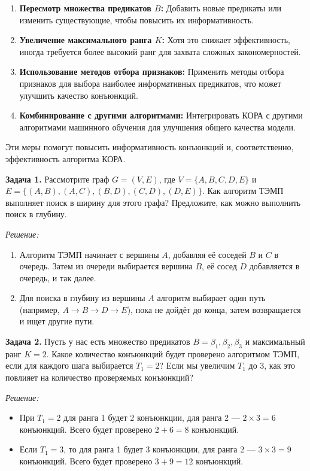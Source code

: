 \begin{itemize}
\begin{enumerate}
    \item \textbf{Пересмотр множества предикатов \( B \):} Добавить новые предикаты или изменить существующие, чтобы повысить их информативность.
    \item \textbf{Увеличение максимального ранга \( K \):} Хотя это снижает эффективность, иногда требуется более высокий ранг для захвата сложных закономерностей.
    \item \textbf{Использование методов отбора признаков:} Применить методы отбора признаков для выбора наиболее информативных предикатов, что может улучшить качество конъюнкций.
    \item \textbf{Комбинирование с другими алгоритмами:} Интегрировать КОРА с другими алгоритмами машинного обучения для улучшения общего качества модели.
\end{enumerate}

Эти меры помогут повысить информативность конъюнкций и, соответственно, эффективность алгоритма КОРА.

\textbf{Задача 1.}
\newline
Рассмотрите граф $G = (V, E)$, где $V = \{A, B, C, D, E\}$ и $E = \{(A, B), (A, C), (B, D), (C, D), (D, E)\}$. Как алгоритм ТЭМП выполняет поиск в ширину для этого графа? Предложите, как можно выполнить поиск в глубину.

\textit{Решение:}
\begin{enumerate}
    \item Алгоритм ТЭМП начинает с вершины $A$, добавляя её соседей $B$ и $C$ в очередь. Затем из очереди выбирается вершина $B$, её сосед $D$ добавляется в очередь, и так далее.
    \item Для поиска в глубину из вершины $A$ алгоритм выбирает один путь (например, $A \to B \to D \to E$), пока не дойдёт до конца, затем возвращается и ищет другие пути.
\end{enumerate}

\textbf{Задача 2.}
\newline
Пусть у нас есть множество предикатов $B = \beta_1, \beta_2, \beta_3$ и максимальный ранг $K = 2$. Какое количество конъюнкций будет проверено алгоритмом ТЭМП, если для каждого шага выбирается $T_1 = 2$? Если мы увеличим $T_1$ до 3, как это повлияет на количество проверяемых конъюнкций?

\textit{Решение:}
\begin{itemize}
    \item При $T_1 = 2$ для ранга 1 будет 2 конъюнкции, для ранга 2 --- $2 \times 3 = 6$ конъюнкций. Всего будет проверено $2 + 6 = 8$ конъюнкций.
    \item Если $T_1 = 3$, то для ранга 1 будет 3 конъюнкции, для ранга 2 --- $3 \times 3 = 9$ конъюнкций. Всего будет проверено $3 + 9 = 12$ конъюнкций.
\end{itemize}


\end{itemize}
